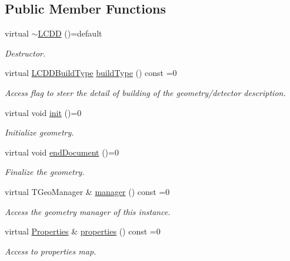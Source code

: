 \subsection*{Public Member Functions}
\begin{DoxyCompactItemize}
\item 
virtual \hyperlink{class_d_d4hep_1_1_geometry_1_1_l_c_d_d_ad0d1630bbdef5d450099a08ec1ac9451}{$\sim$\+L\+C\+DD} ()=default
\begin{DoxyCompactList}\small\item\em Destructor. \end{DoxyCompactList}\item 
virtual \hyperlink{namespace_d_d4hep_acafe43ba4537ab6e999e808142965fab}{L\+C\+D\+D\+Build\+Type} \hyperlink{class_d_d4hep_1_1_geometry_1_1_l_c_d_d_a73400f14f6384e1c84470595fc3667fd}{build\+Type} () const =0
\begin{DoxyCompactList}\small\item\em Access flag to steer the detail of building of the geometry/detector description. \end{DoxyCompactList}\item 
virtual void \hyperlink{class_d_d4hep_1_1_geometry_1_1_l_c_d_d_a9a4f55004e7375b2b20fb64e1a7ee8de}{init} ()=0
\begin{DoxyCompactList}\small\item\em Initialize geometry. \end{DoxyCompactList}\item 
virtual void \hyperlink{class_d_d4hep_1_1_geometry_1_1_l_c_d_d_abe2147b8363040ce95bb40f810d95b36}{end\+Document} ()=0
\begin{DoxyCompactList}\small\item\em Finalize the geometry. \end{DoxyCompactList}\item 
virtual T\+Geo\+Manager \& \hyperlink{class_d_d4hep_1_1_geometry_1_1_l_c_d_d_af209f1ecaad7336e14ffee002215aa93}{manager} () const =0
\begin{DoxyCompactList}\small\item\em Access the geometry manager of this instance. \end{DoxyCompactList}\item 
virtual \hyperlink{class_d_d4hep_1_1_geometry_1_1_l_c_d_d_a89096744868821bf5dcb0c0560b348c9}{Properties} \& \hyperlink{class_d_d4hep_1_1_geometry_1_1_l_c_d_d_a15fac6166c5a16968cf9f60b515f4125}{properties} () const =0
\begin{DoxyCompactList}\small\item\em Access to properties map. \end{DoxyCompactList}\item 

\end{DoxyCompactItemize}
